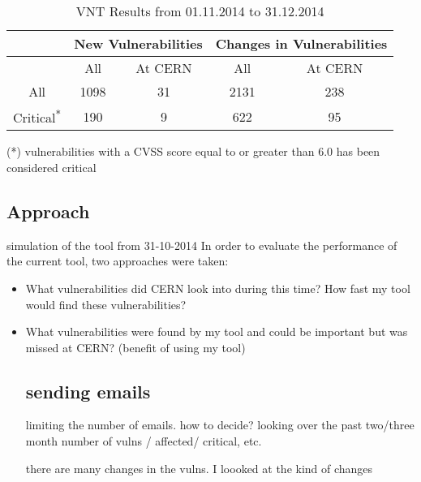 {{\begin{table}
\begin{center}
\begin{tabular}{ | c || c | c || c | c |}
     &  \multicolumn{2}{c||}{New Vulnerabilities} &  \multicolumn{2}{c|}{Changes in Vulnerabilities}  
	\\ \hline   
      &  All &  At CERN &  All &  At CERN
    \\ 
	\hline    
    \hhline{|*5-}
       All & \multicolumn{1}{|c|}{\cellcolor{red!25}1098}   &  31 & \multicolumn{1}{c|}{\cellcolor{red!25}2131}  & 238 
   \\ \hhline{|*5-}
\hhline{~~|-|~|-|}
Critical\textsuperscript{*} & 190  & \multicolumn{1}{|c||}{\cellcolor{green!25}9}  & 622  & \multicolumn{1}{|c|}{\cellcolor{green!25}95  }
    \\ \hline
    \end{tabular}
    \caption{VNT Results from 01.11.2014 to 31.12.2014}
    \label{table:vnt_results}
   \end{center}
   \footnotesize{(*) vulnerabilities with a CVSS score equal to or greater than 6.0 has been considered critical}
    \end{table}





\subsection{Approach}
simulation of the tool from 31-10-2014 
In order to evaluate the performance of the current tool, two approaches were taken:
\begin{itemize}
\item What vulnerabilities did CERN look into during this time? How fast my tool would find these vulnerabilities?
\item What vulnerabilities were found by my tool and could be important but was missed at CERN? (benefit of using my tool)

\subsection{sending emails}
limiting the number of emails. how to decide? looking over the past two/three month
number of vulns / affected/ critical, etc.

there are many changes in the vulns. I loooked at the kind of changes 


\end{itemize}}}
